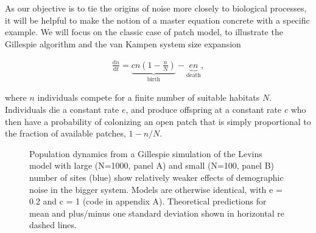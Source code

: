 \documentclass[
  authoryear,
  preprint,
  3p]{elsarticle}
\begin{document}
As our objective is to tie the origins of noise more closely to
biological processes, it will be helpful to make the notion of a master
equation concrete with a specific example. We will focus on the classic
case of \citet{Levins1969} patch model, to illustrate the Gillespie
algorithm and the van Kampen system size expansion

\begin{align}
\frac{\mathrm{d} n}{\mathrm{d} t} = \underbrace{c n \left(1 - \frac{n}{N}\right)}_{\textrm{birth}} - \underbrace{e n}_{\textrm{death}}, \label{levins}
\end{align}

where \(n\) individuals compete for a finite number of suitable habitats
\(N\). Individuals die a constant rate \(e\), and produce offspring at a
constant rate \(c\) who then have a probability of colonizing an open
patch that is simply proportional to the fraction of available patches,
\(1 - n/N\).

\begin{figure}


\caption{\label{fig-site-simulation}Population dynamics from a Gillespie
simulation of the Levins model with large (N=1000, panel A) and small
(N=100, panel B) number of sites (blue) show relatively weaker effects
of demographic noise in the bigger system. Models are otherwise
identical, with e = 0.2 and c = 1 (code in appendix A). Theoretical
predictions for mean and plus/minus one standard deviation shown in
horizontal re dashed lines.}

\end{figure}%
\end{document}
